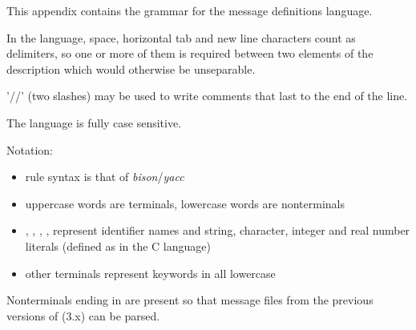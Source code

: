 \label{cha:msg-language-grammar}

This appendix contains the grammar for the message definitions
language.

In the language, space, horizontal tab and new line characters count
as delimiters, so one or more of them is required between two elements of the
description which would otherwise be unseparable.

'//' (two slashes) may be used to write comments that last to the end of the line.

The language is fully case sensitive.

Notation:
\begin{itemize}
  \item{rule syntax is that of \textit{bison}/\textit{yacc}}
  \item{uppercase words are terminals, lowercase words are nonterminals}
  \item{, , , ,
         represent identifier names and string, character,
        integer and real number literals (defined as in the C language)}
  \item{other terminals represent keywords in all lowercase}
\end{itemize}

Nonterminals ending in  are present so that message files
from the previous versions of {\opp} (3.x) can be parsed.

%
%
%

